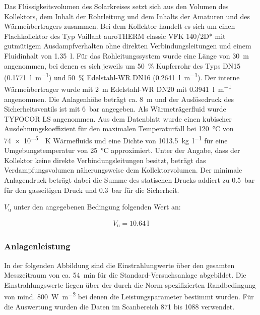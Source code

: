 Das Flüssigkeitsvolumen des Solarkreises setzt sich aus den Volumen des Kollektors, dem Inhalt der Rohrleitung und dem Inhalts der Amaturen und des Wärmeübertragers zusammen. Bei dem Kollektor handelt es sich um einen Flachkollektor des Typ Vaillant auroTHERM classic VFK 140/2D* mit gutmütigem Ausdampfverhalten ohne direkten Verbindungsleitungen und einem Fluidinhalt von \SI{1,35}{\litre}. Für das Rohleitungssystem wurde eine Länge von \SI{30}{\metre} angenommen, bei denen es sich jeweils um \SI{50}{\percent} Kupferrohr des Typs DN15 (\SI{0,1771}{\litre\per\metre}) und \SI{50}{\percent} Edelstahl-WR DN16 (\SI{0,2641}{\litre\per\metre}). Der interne Wärmeübertrager wurde mit \SI{2}{\metre} Edelstahl-WR DN20 mit \SI{0,3941}{\litre\per\metre} angenommen. Die Anlagenhöhe beträgt ca. \SI{8}{\metre} und der Auslösedruck des Sicherheitsventils ist mit \SI{6}{\bar} angegeben. Als Wärmeträgerfluid wurde TYFOCOR LS angenommen. Aus dem Datenblatt wurde einen kubischer Ausdehnungskoeffizient für den maximalen Temperaturfall bei \SI{120}{\celsius} von \SI{74e-5}{\per\kelvin} Wärmefluids und eine Dichte von \SI{1013,5}{\kg\per\litre} für eine Umgebungstemperatur von \SI{25}{\celsius} approximiert. Unter der Angabe, dass der Kollektor keine direkte Verbindungsleitungen besitzt, beträgt das Verdampfungsvolumen näherungsweise dem Kollektorvolumen. Der minimale Anlagendruck beträgt dabei die Summe des statischen Drucks addiert zu \SI{0,5}{\bar} für den gasseitigen Druck und \SI{0,3}{\bar} für die Sicherheit. 

$V_{\text{u}}$ unter den angegebenen Bedingung folgenden Wert an:

\begin{equation*}
	\label{MAG-Ber.}
	\begin{aligned}
	V_{\text{u}}=  \SI{10,64}{\litre}
	\end{aligned}
\end{equation*}

\subsubsection{Anlagenleistung}

In der folgenden Abbildung sind die Einstrahlungwerte über den gesamten Messzeitraum von ca. \SI{54}{\minute} für die Standard-Versuchsanlage abgebildet. 
Die Einstrahlungswerte liegen über der durch die Norm spezifizierten Randbedingung von mind. \SI{800}{\watt\per\meter\squared} bei denen die Leistungsparameter bestimmt wurden. Für die Auswertung wurden die Daten im Scanbereich 871 bis 1088 verwendet.

